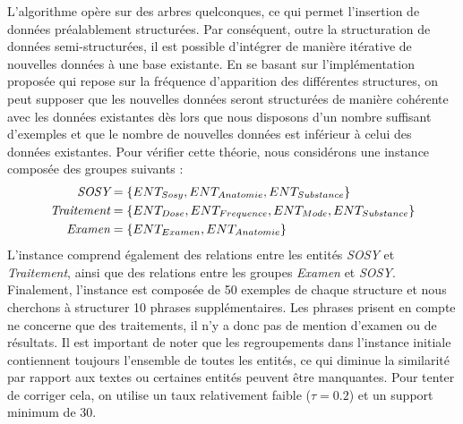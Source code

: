 L'algorithme opère sur des arbres quelconques, ce qui permet l'insertion de données préalablement structurées.
Par conséquent, outre la structuration de données semi-structurées, il est possible d'intégrer de manière itérative de nouvelles données à une base existante.
En se basant sur l'implémentation proposée qui repose sur la fréquence d'apparition des différentes structures, on peut supposer que les nouvelles données seront structurées de manière cohérente avec les données existantes dès lors que nous disposons d'un nombre suffisant d'exemples et que le nombre de nouvelles données est inférieur à celui des données existantes.
Pour vérifier cette théorie, nous considérons une instance composée des groupes suivants :
\begin{align*}
    \emph{SOSY} &= \{ENT_{Sosy}, ENT_{Anatomie}, ENT_{Substance}\} \\
    \emph{Traitement} &= \{ENT_{Dose}, ENT_{Frequence}, ENT_{Mode}, ENT_{Substance}\} \\
    \emph{Examen} &= \{ENT_{Examen}, ENT_{Anatomie}\}
\end{align*}
L'instance comprend également des relations entre les entités \emph{SOSY} et \emph{Traitement}, ainsi que des relations entre les groupes \emph{Examen} et \emph{SOSY}.
Finalement, l'instance est composée de \num{50} exemples de chaque structure et nous cherchons à structurer \num{10} phrases supplémentaires.
Les phrases prisent en compte ne concerne que des traitements, il n'y a donc pas de mention d'examen ou de résultats.
Il est important de noter que les regroupements dans l'instance initiale contiennent toujours l'ensemble de toutes les entités, ce qui diminue la similarité par rapport aux textes ou certaines entités peuvent être manquantes.
Pour tenter de corriger cela, on utilise un taux relativement faible ($\tau = 0.2$) et un support minimum de \num{30}.

